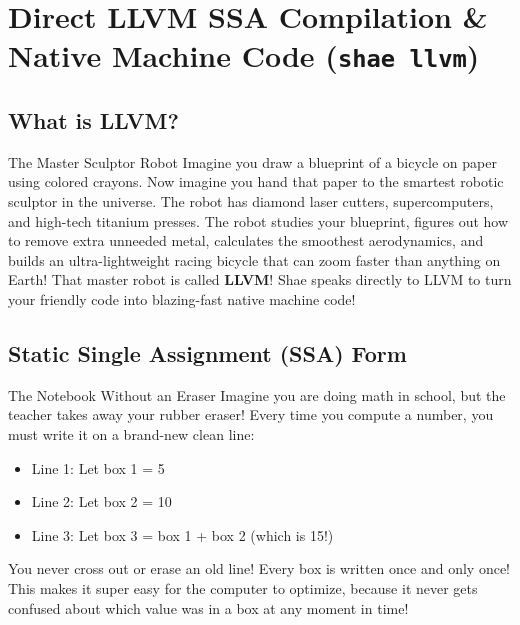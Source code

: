 \chapter{Direct LLVM SSA Compilation \& Native Machine Code (\texttt{shae llvm})}

\section{What is LLVM?}

\begin{kidbox}{The Master Sculptor Robot}
Imagine you draw a blueprint of a bicycle on paper using colored crayons.
Now imagine you hand that paper to the smartest robotic sculptor in the universe.
The robot has diamond laser cutters, supercomputers, and high-tech titanium presses.
The robot studies your blueprint, figures out how to remove extra unneeded metal, calculates the smoothest aerodynamics, and builds an ultra-lightweight racing bicycle that can zoom faster than anything on Earth!
That master robot is called \textbf{LLVM}!
Shae speaks directly to LLVM to turn your friendly code into blazing-fast native machine code!
\end{kidbox}

\section{Static Single Assignment (SSA) Form}

\begin{kidbox}{The Notebook Without an Eraser}
Imagine you are doing math in school, but the teacher takes away your rubber eraser!
Every time you compute a number, you must write it on a brand-new clean line:
\begin{itemize}
    \item Line 1: Let box 1 = 5
    \item Line 2: Let box 2 = 10
    \item Line 3: Let box 3 = box 1 + box 2 (which is 15!)
\end{itemize}
You never cross out or erase an old line! Every box is written once and only once!
This makes it super easy for the computer to optimize, because it never gets confused about which value was in a box at any moment in time!
\end{kidbox}


